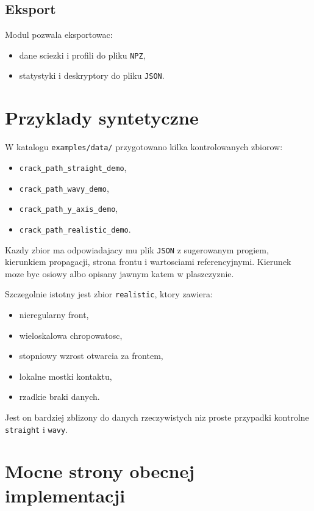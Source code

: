 \documentclass[11pt,a4paper]{article}
\begin{document}
\subsection{Eksport}

Modul pozwala eksportowac:

\begin{itemize}[leftmargin=1.5em]
    \item dane sciezki i profili do pliku \texttt{NPZ},
    \item statystyki i deskryptory do pliku \texttt{JSON}.
\end{itemize}

\section{Przyklady syntetyczne}

W katalogu \texttt{examples/data/} przygotowano kilka kontrolowanych zbiorow:

\begin{itemize}[leftmargin=1.5em]
    \item \texttt{crack\_path\_straight\_demo},
    \item \texttt{crack\_path\_wavy\_demo},
    \item \texttt{crack\_path\_y\_axis\_demo},
    \item \texttt{crack\_path\_realistic\_demo}.
\end{itemize}

Kazdy zbior ma odpowiadajacy mu plik \texttt{JSON} z sugerowanym progiem,
kierunkiem propagacji, strona frontu i wartosciami referencyjnymi. Kierunek
moze byc osiowy albo opisany jawnym katem w plaszczyznie.

Szczegolnie istotny jest zbior \texttt{realistic}, ktory zawiera:

\begin{itemize}[leftmargin=1.5em]
    \item nieregularny front,
    \item wieloskalowa chropowatosc,
    \item stopniowy wzrost otwarcia za frontem,
    \item lokalne mostki kontaktu,
    \item rzadkie braki danych.
\end{itemize}

Jest on bardziej zblizony do danych rzeczywistych niz proste przypadki
kontrolne \texttt{straight} i \texttt{wavy}.

\section{Mocne strony obecnej implementacji}
\end{document}

